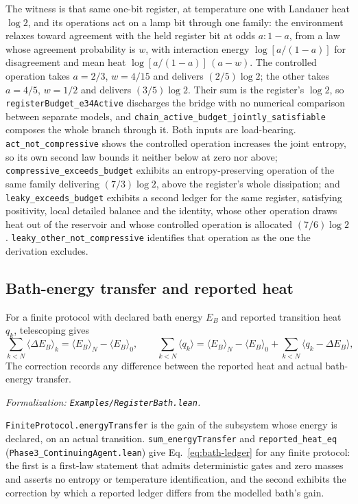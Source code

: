 \documentclass{article}
\begin{document}
The witness is that same one-bit register, at temperature one with Landauer heat $\log2$, and its operations act on a lamp bit through one family: the environment relaxes toward agreement with the held register bit at odds $a:1-a$, from a law whose agreement probability is $w$, with interaction energy $\log[a/(1-a)]$ for disagreement and mean heat $\log[a/(1-a)]\,(a-w)$. The controlled operation takes $a=2/3$, $w=4/15$ and delivers $(2/5)\log2$; the other takes $a=4/5$, $w=1/2$ and delivers $(3/5)\log2$. Their sum is the register's $\log2$, so \nolinkurl{registerBudget_e34Active} discharges the bridge with no numerical comparison between separate models, and \nolinkurl{chain_active_budget_jointly_satisfiable} composes the whole branch through it. Both inputs are load-bearing. \nolinkurl{act_not_compressive} shows the controlled operation increases the joint entropy, so its own second law bounds it neither below at zero nor above; \nolinkurl{compressive_exceeds_budget} exhibits an entropy-preserving operation of the same family delivering $(7/3)\log2$, above the register's whole dissipation; and \nolinkurl{leaky_exceeds_budget} exhibits a second ledger for the same register, satisfying positivity, local detailed balance and the identity, whose other operation draws heat out of the reservoir and whose controlled operation is allocated $(7/6)\log2$. \nolinkurl{leaky_other_not_compressive} identifies that operation as the one the derivation excludes.

\subsection{Bath-energy transfer and reported heat}
\label{sec:supp-bath}

For a finite protocol with declared bath energy $E_B$ and reported transition heat $q_k$, telescoping gives
\begin{equation}
 \sum_{k<N}\langle\Delta E_B\rangle_k=\langle E_B\rangle_N-\langle E_B\rangle_0,
 \qquad
 \sum_{k<N}\langle q_k\rangle=\langle E_B\rangle_N-\langle E_B\rangle_0
   +\sum_{k<N}\langle q_k-\Delta E_B\rangle,
 \label{eq:bath-ledger}
\end{equation}
The correction records any difference between the reported heat and actual bath-energy transfer.

\textit{Formalization: \texttt{Examples/RegisterBath.lean}.}

\texttt{FiniteProtocol.energyTransfer} is the gain of the subsystem whose
energy is declared, on an actual transition.
\nolinkurl{sum_energyTransfer} and
\nolinkurl{reported_heat_eq}
(\nolinkurl{Phase3_ContinuingAgent.lean}) give Eq.~\eqref{eq:bath-ledger} for any finite protocol: the first is a first-law
statement that admits deterministic gates and zero masses and asserts no
entropy or temperature identification, and the second exhibits the correction
by which a reported ledger differs from the modelled bath's gain.
\end{document}
